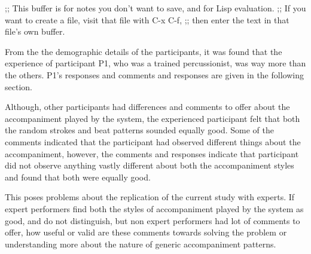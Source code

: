 ;; This buffer is for notes you don't want to save, and for Lisp evaluation.
;; If you want to create a file, visit that file with C-x C-f,
;; then enter the text in that file's own buffer.


From the the demographic details of the participants, it was found that the experience of participant P1, who was a trained percussionist, was way more than the others. P1's responses and comments and responses are given in the following section.



Although, other participants had differences and comments to offer about the accompaniment played by the system, the experienced participant felt that both the random strokes and beat patterns sounded equally good. Some of the comments indicated that the participant had observed different things about the accompaniment, however, the comments and responses indicate that participant did not observe anything vastly different about both the accompaniment styles and found that both were equally good.

This poses problems about the replication of the current study with experts. If expert performers find both the styles of accompaniment played by the system as good, and do not distinguish, but non expert performers had lot of comments to offer, how useful or valid are these comments towards solving the problem or understanding more about the nature of generic accompaniment patterns.
